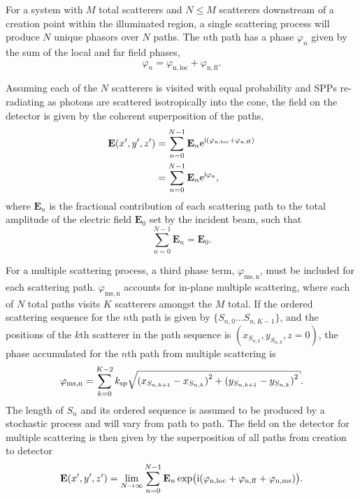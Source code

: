 For a system with $M$ total scatterers and $N \leq M$ scatterers downstream of
a creation point within the illuminated region, a single scattering process
will produce $N$ unique phasors over $N$ paths.  The $n$th path has a
phase $\varphi_n$ given by the sum of the local and far field phases,
\begin{equation}
\varphi_n = \varphi_\mathrm{n,loc}+\varphi_\mathrm{n,ff}. 
\end{equation}

Assuming each of the $N$ scatterers is visited with equal probability and SPPs
re-radiating as photons are scattered isotropically into the cone, the field
on the detector is given by the coherent superposition of the paths,
\begin{align}
\mathbf{E}(x^\prime,y^\prime,z^\prime) &=
\sum_{n=0}^{N-1}
\mathbf{E}_n {\mathrm{e}}^{{\mathrm{i}}{(\varphi_\mathrm{n,loc}+\varphi_\mathrm{n,ff})}}\\
&=
\sum_{n=0}^{N-1}
\mathbf{E}_n {\mathrm{e}}^{{\mathrm{i}}{\varphi_\mathrm{n}}},
\end{align}
where $\mathbf{E}_n$ is the fractional contribution of each scattering path to
the total amplitude of the electric field $\mathbf{E}_0$ set by the incident
beam, such that
\begin{equation}
\sum_{n=0}^{N-1}\mathbf{E}_n = \mathbf{E}_0.
\end{equation}

For a multiple scattering process, a third phase term,
$\varphi_\mathrm{ms,n}$, must be included for each scattering path.
$\varphi_\mathrm{ms,n}$ accounts for in-plane multiple scattering, where each
of $N$ total paths visits $K$ scatterers amongst the $M$ total.  If the
ordered scattering sequence for the $n$th path is given by $\{S_{n,0} \ldots
S_{n,{K-1}}\}$, and the positions of the $k$th scatterer in the path sequence
is $(x_{S_{n,k}},y_{S_{n,k}},z=0)$, the phase accumulated for the $n$th path from
multiple scattering is
\begin{equation}
\varphi_\mathrm{ms,n}=\sum_{k=0}^{K-2}
\ksp \sqrt{{(x_{S_{n,{k+1}}}-x_{S_{n,k}})}^2+{(y_{S_{n,{k+1}}}-y_{S_{n,k}})}^2}.
\label{eqn:multiplescatteringphase}
\end{equation}
The length of $S_n$ and its ordered sequence is assumed to be produced by a stochastic
process and will vary from path to path.  The field on the detector
for multiple scattering is then given by the superposition of all paths from
creation to detector
\begin{equation}
\mathbf{E}(x^\prime,y^\prime,z^\prime) =
\lim_{N\to\infty}
\sum_{n=0}^{N-1}
\mathbf{E}_n
\exp\!\big({{\mathrm{i}}{(\varphi_\mathrm{n,loc}+\varphi_\mathrm{n,ff}+\varphi_\mathrm{n,ms})}}\big).
\label{eqn:smicromsphase}
\end{equation}

